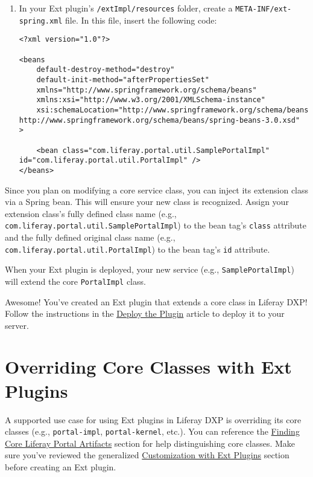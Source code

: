 \begin{enumerate}
\def\labelenumi{\arabic{enumi}.}
\setcounter{enumi}{3}
\item
  In your Ext plugin's \texttt{/extImpl/resources} folder, create a
  \texttt{META-INF/ext-spring.xml} file. In this file, insert the
  following code:

\begin{verbatim}
<?xml version="1.0"?>

<beans
    default-destroy-method="destroy"
    default-init-method="afterPropertiesSet"
    xmlns="http://www.springframework.org/schema/beans"
    xmlns:xsi="http://www.w3.org/2001/XMLSchema-instance"
    xsi:schemaLocation="http://www.springframework.org/schema/beans http://www.springframework.org/schema/beans/spring-beans-3.0.xsd"
>

    <bean class="com.liferay.portal.util.SamplePortalImpl" id="com.liferay.portal.util.PortalImpl" />
</beans>
\end{verbatim}
\end{enumerate}

Since you plan on modifying a core service class, you can inject its
extension class via a Spring bean. This will ensure your new class is
recognized. Assign your extension class's fully defined class name
(e.g., \texttt{com.liferay.portal.util.SamplePortalImpl}) to the bean
tag's \texttt{class} attribute and the fully defined original class name
(e.g., \texttt{com.liferay.portal.util.PortalImpl}) to the bean tag's
\texttt{id} attribute.

When your Ext plugin is deployed, your new service (e.g.,
\texttt{SamplePortalImpl}) will extend the core \texttt{PortalImpl}
class.

Awesome! You've created an Ext plugin that extends a core class in
Liferay DXP! Follow the instructions in the
\href{/docs/7-2/customization/-/knowledge_base/c/deploying-an-ext-plugin}{Deploy
the Plugin} article to deploy it to your server.

\chapter{Overriding Core Classes with Ext
Plugins}\label{overriding-core-classes-with-ext-plugins}

A supported use case for using Ext plugins in Liferay DXP is overriding
its core classes (e.g., \texttt{portal-impl}, \texttt{portal-kernel},
etc.). You can reference the
\href{/docs/7-2/customization/-/knowledge_base/c/finding-artifacts\#finding-core-artifact-attributes}{Finding
Core Liferay Portal Artifacts} section for help distinguishing core
classes. Make sure you've reviewed the generalized
\href{/docs/7-2/customization/-/knowledge_base/c/customizing-core-functionality-with-ext}{Customization
with Ext Plugins} section before creating an Ext plugin.

